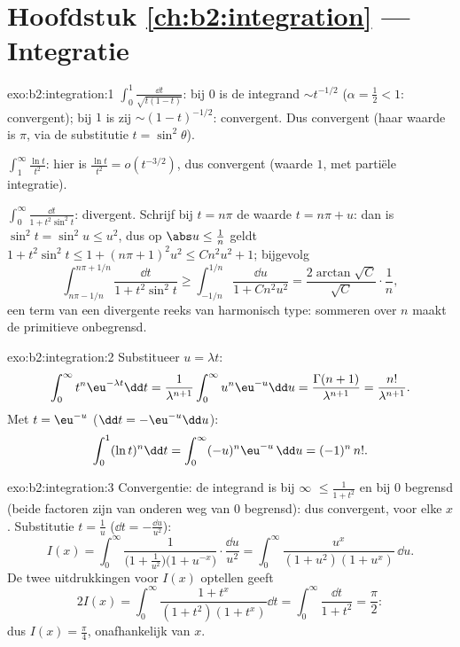 \section*{Hoofdstuk \ref{ch:b2:integration} --- Integratie}

\begin{solution}{exo:b2:integration:1}
$\int_0^1 \frac{\dd t}{\sqrt{t(1-t)}}$: bij $0$ is de integrand
$\sim t^{-1/2}$ ($\alpha = \frac12 < 1$: convergent); bij $1$ is
zij $\sim (1-t)^{-1/2}$: convergent. Dus convergent (haar waarde is
$\pi$, via de substitutie $t = \sin^2\theta$).

$\int_1^\infty \frac{\ln t}{t^2}$: hier is $\frac{\ln t}{t^2} =
o(t^{-3/2})$, dus convergent (waarde $1$, met partiële
integratie).

$\int_0^\infty \frac{\dd t}{1 + t^2\sin^2 t}$: divergent. Schrijf
bij $t = n\pi$ de waarde $t = n\pi + u$: dan is $\sin^2 t = \sin^2
u \leq u^2$, dus op $\abs u \leq \frac{1}{n}$ geldt $1 + t^2\sin^2
t \leq 1 + (n\pi + 1)^2u^2 \leq C n^2 u^2 + 1$; bijgevolg
\[
\int_{n\pi - 1/n}^{n\pi + 1/n} \frac{\dd t}{1 + t^2\sin^2 t}
\geq \int_{-1/n}^{1/n} \frac{\dd u}{1 + Cn^2u^2}
= \frac{2\arctan\sqrt C}{\sqrt C}\cdot\frac{1}{n} ,
\]
een term van een divergente reeks van harmonisch type: sommeren
over $n$ maakt de primitieve onbegrensd.
\end{solution}

\begin{solution}{exo:b2:integration:2}
Substitueer $u = \lambda t$:
\[
\int_0^\infty t^n \eu^{-\lambda t}\dd t
= \frac{1}{\lambda^{n+1}}\int_0^\infty u^n\eu^{-u}\dd u
= \frac{\Gamma(n+1)}{\lambda^{n+1}} = \frac{n!}{\lambda^{n+1}} .
\]
Met $t = \eu^{-u}$ ($\dd t = -\eu^{-u}\dd u$):
\[
\int_0^1 (\ln t)^n \dd t = \int_0^{\infty} (-u)^n \eu^{-u}\,\dd u
= (-1)^n\, n! .
\]
\end{solution}

\begin{solution}{exo:b2:integration:3}
Convergentie: de integrand is bij $\infty$ $\leq \frac{1}{1+t^2}$
en bij $0$ begrensd (beide factoren zijn van onderen weg van $0$
begrensd): dus  convergent, voor elke $x$. Substitutie $t =
\frac1u$ ($\dd t = -\frac{\dd u}{u^2}$):
\[
I(x) = \int_0^\infty \frac{1}{\bigl(1 +
\frac1{u^2}\bigr)\bigl(1 + u^{-x}\bigr)}\cdot\frac{\dd u}{u^2}
= \int_0^\infty \frac{u^x}{(1 + u^2)(1 + u^x)}\,\dd u .
\]
De twee uitdrukkingen voor $I(x)$ optellen geeft
\[
2I(x) = \int_0^\infty \frac{1 + t^x}{(1+t^2)(1+t^x)}\dd t
= \int_0^\infty \frac{\dd t}{1 + t^2} = \frac{\pi}{2} :
\]
dus $I(x) = \frac\pi4$, onafhankelijk van $x$.
\end{solution}

